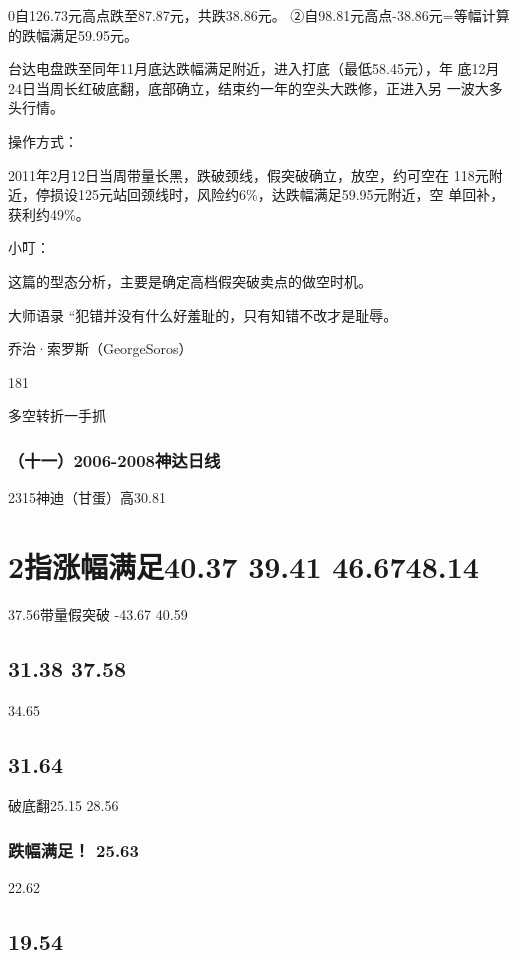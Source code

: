 \documentclass{article}
\begin{document}
0自126.73元高点跌至87.87元，共跌38.86元。 ②自98.81元高点-38.86元=等幅计算的跌幅满足59.95元。

台达电盘跌至同年11月底达跌幅满足附近，进入打底（最低58.45元），年 底12月24日当周长红破底翻，底部确立，结束约一年的空头大跌修，正进入另 一波大多头行情。

操作方式：

2011年2月12日当周带量长黑，跌破颈线，假突破确立，放空，约可空在 118元附近，停损设125元站回颈线时，风险约6\%，达跌幅满足59.95元附近，空 单回补，获利约49\%。

小叮：

这篇的型态分析，主要是确定高档假突破卖点的做空时机。

大师语录 “犯错并没有什么好羞耻的，只有知错不改才是耻辱。

乔治·索罗斯（GeorgeSoros）

181

\clearpage

多空转折一手抓

\subsubsection{（十一）2006-2008神达日线}

2315神迪（甘蛋）高30.81

\section{2指涨幅满足40.37 39.41 46.6748.14}

37.56带量假突破 -43.67 40.59

\subsection{31.38 37.58}

34.65

\subsection{31.64}

破底翻25.15 28.56

\subsubsection{跌幅满足！ 25.63}

22.62

\subsection{19.54}
\end{document}
